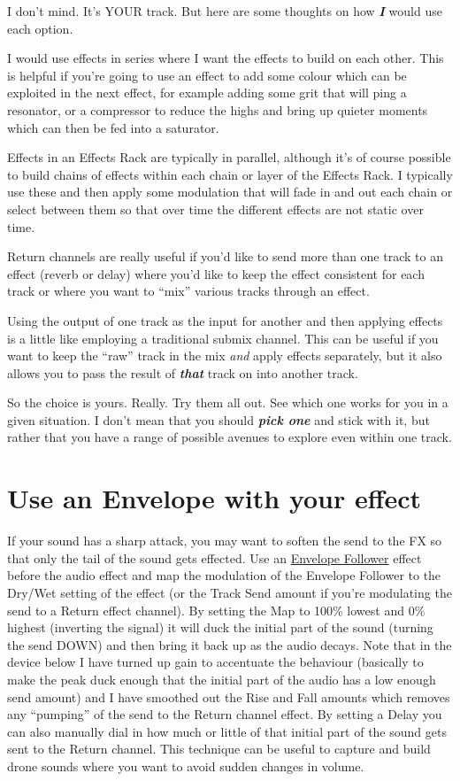 \documentclass[
  12pt,
  letterpaper,
  oneside,
  open=any]{scrbook}
\begin{document}
I don't mind. It's YOUR track. But here are some thoughts on how
\textbf{\emph{I}} would use each option.

I would use effects in series where I want the effects to build on each
other. This is helpful if you're going to use an effect to add some
colour which can be exploited in the next effect, for example adding
some grit that will ping a resonator, or a compressor to reduce the
highs and bring up quieter moments which can then be fed into a
saturator.

Effects in an Effects Rack are typically in parallel, although it's of
course possible to build chains of effects within each chain or layer of
the Effects Rack. I typically use these and then apply some modulation
that will fade in and out each chain or select between them so that over
time the different effects are not static over time.

Return channels are really useful if you'd like to send more than one
track to an effect (reverb or delay) where you'd like to keep the effect
consistent for each track or where you want to ``mix'' various tracks
through an effect.

Using the output of one track as the input for another and then applying
effects is a little like employing a traditional submix channel. This
can be useful if you want to keep the ``raw'' track in the mix
\emph{and} apply effects separately, but it also allows you to pass the
result of \textbf{\emph{that}} track on into another track.

So the choice is yours. Really. Try them all out. See which one works
for you in a given situation. I don't mean that you should
\textbf{\emph{pick one}} and stick with it, but rather that you have a
range of possible avenues to explore even within one track.

\section{Use an Envelope with your
effect}\label{use-an-envelope-with-your-effect}

If your sound has a sharp attack, you may want to soften the send to the
FX so that only the tail of the sound gets effected. Use an
\href{https://www.ableton.com/en/live-manual/11/max-for-live-devices/\#envelope-follower}{Envelope
Follower} effect before the audio effect and map the modulation of the
Envelope Follower to the Dry/Wet setting of the effect (or the Track
Send amount if you're modulating the send to a Return effect channel).
By setting the Map to 100\% lowest and 0\% highest (inverting the
signal) it will duck the initial part of the sound (turning the send
DOWN) and then bring it back up as the audio decays. Note that in the
device below I have turned up gain to accentuate the behaviour
(basically to make the peak duck enough that the initial part of the
audio has a low enough send amount) and I have smoothed out the Rise and
Fall amounts which removes any ``pumping'' of the send to the Return
channel effect. By setting a Delay you can also manually dial in how
much or little of that initial part of the sound gets sent to the Return
channel. This technique can be useful to capture and build drone sounds
where you want to avoid sudden changes in volume.
\end{document}
